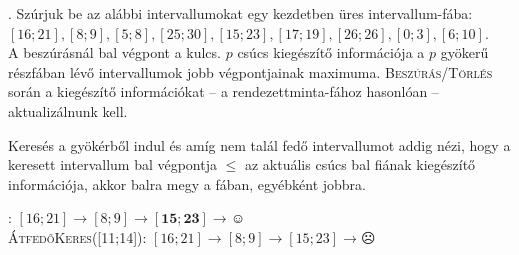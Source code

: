 \documentclass[12pt]{article}
\begin{document}
. Szúrjuk be az alábbi intervallumokat egy kezdetben üres intervallum-fába: \\
$[16;21], [8;9], [5;8], [25;30], [15;23], [17;19],
[26;26], [0;3], [6;10]$.\\
A beszúrásnál bal végpont a kulcs. $p$ csúcs kiegészítő információja a $p$ gyökerű részfában lévő intervallumok jobb végpontjainak maximuma.
{\scshape Beszúrás/Törlés} során a kiegészítő információkat -- a rendezettminta-fához hasonlóan -- aktualizálnunk kell.

\begin{figure}[!h]
\centering
\end{figure}

\noindent Keresés a gyökérből indul és amíg nem talál fedő intervallumot addig nézi, hogy a keresett intervallum
bal végpontja $\leq$ az aktuális csúcs bal fiának kiegészítő információja, akkor balra megy a fában, egyébként
jobbra.

: $[16;21] \rightarrow [8;9] \rightarrow \mathbf{[15;23]} \rightarrow \smiley$ \\
{\scshape ÁtfedőKeres([11;14])}: $[16;21] \rightarrow [8;9] \rightarrow [15;23] \rightarrow \frownie$
\end{document}
